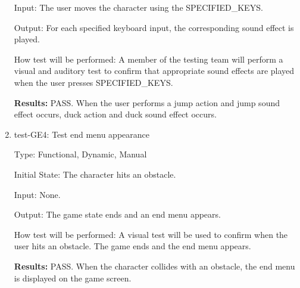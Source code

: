 \documentclass[12pt, titlepage]{article}
\begin{document}
\begin{enumerate}
Input: The user moves the character using the SPECIFIED\_KEYS.
					
Output: For each specified keyboard input, the corresponding sound effect is played.
					
How test will be performed: A member of the testing team will perform a visual and auditory test to confirm that appropriate sound effects are played when the user presses SPECIFIED\_KEYS.

\textbf{Results:} PASS. When the user performs a jump action and jump sound effect occurs, duck action and duck sound effect occurs.

\item{test-GE4: Test end menu appearance\\}

Type: Functional, Dynamic, Manual
					
Initial State: The character hits an obstacle.
					
Input: None.
					
Output: The game state ends and an end menu appears.
					
How test will be performed: A visual test will be used to confirm when the user hits an obstacle. The game ends and the end menu appears.

\textbf{Results:} PASS. When the character collides with an obstacle, the end menu is displayed on the game screen.

\end{enumerate}
\end{document}
